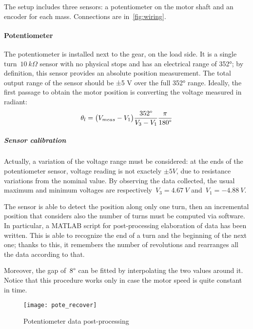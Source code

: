 The setup includes three sensors: a potentiometer on the motor shaft and an encoder for each mass. Connections are in~\cref{fig:wiring}.

\paragraph{Potentiometer}
The potentiometer is installed next to the gear, on the load side. It is a single turn~$10 \ k\Omega$ sensor with no physical stops and has an electrical range of 352°; by definition, this sensor provides an absolute position measurement.
The total output range of the sensor should be ±5 V over the full 352° range.
Ideally, the first passage to obtain the motor position is converting the voltage measured in radiant:
\[
	\theta_l = \bigl{(} V_{meas} - V_1 \bigr{)} \frac{352 \degree }{V_3 - V_1} \frac{\pi}{180 \degree }
\]

\subparagraph{Sensor calibration}
Actually, a variation of the voltage range must be considered: at the ends of the potentiometer sensor, voltage reading is not exactely $\pm 5V$, due to resistance variations from the nominal value. By observing the data collected, the usual maximum and minimum voltages are respectively~$V_3=4.67 \ V$ and~$V_1=-4.88 \ V$.

The sensor is able to detect the position along only one turn, then an incremental position that considers also the number of turns must be computed via software.
In particular, a MATLAB script for post-processing elaboration of data has been written. This is able to recognize the end of a turn and the beginning of the next one; thanks to this, it remembers the number of revolutions and rearranges all the data according to that.

Moreover, the gap of~$8 \degree$ can be fitted by interpolating the two values around it. Notice that this procedure works only in case the motor speed is quite constant in time.
\begin{figure*}[h]
	\centering
	\texttt{[image: pote\_recover]}
	\caption{Potentiometer data post-processing}
\end{figure*}

